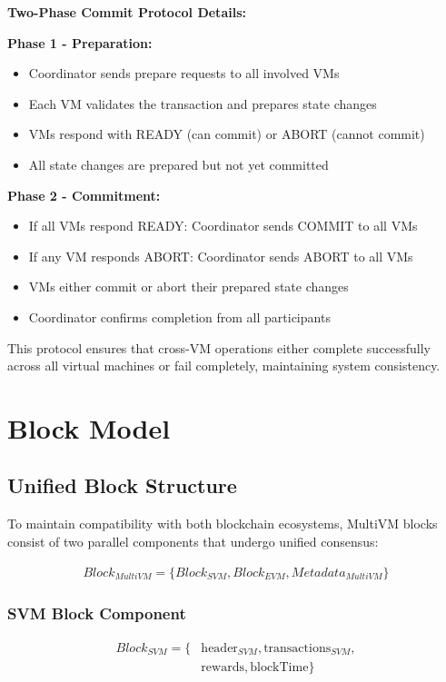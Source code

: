 \documentclass[11pt,a4paper]{article}
\begin{document}
\textbf{Two-Phase Commit Protocol Details:}

\textbf{Phase 1 - Preparation:}
\begin{itemize}
    \item Coordinator sends prepare requests to all involved VMs
    \item Each VM validates the transaction and prepares state changes
    \item VMs respond with READY (can commit) or ABORT (cannot commit)
    \item All state changes are prepared but not yet committed
\end{itemize}

\textbf{Phase 2 - Commitment:}
\begin{itemize}
    \item If all VMs respond READY: Coordinator sends COMMIT to all VMs
    \item If any VM responds ABORT: Coordinator sends ABORT to all VMs
    \item VMs either commit or abort their prepared state changes
    \item Coordinator confirms completion from all participants
\end{itemize}

This protocol ensures that cross-VM operations either complete successfully across all virtual machines or fail completely, maintaining system consistency.

\section{Block Model}

\subsection{Unified Block Structure}

To maintain compatibility with both blockchain ecosystems, MultiVM blocks consist of two parallel components that undergo unified consensus:

\begin{align}
Block_{MultiVM} = \{Block_{SVM}, Block_{EVM}, Metadata_{MultiVM}\}
\end{align}

\subsubsection{SVM Block Component}
\begin{align}
Block_{SVM} = \{&\text{header}_{SVM}, \text{transactions}_{SVM}, \\
                &\text{rewards}, \text{blockTime}\}
\end{align}
\end{document}
